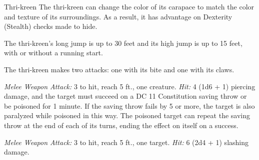 \documentclass[10pt,a4paper,twoside,bg=print,twocolumn,openany,nodeprecatedcode]{dndbook}
\begin{document}
\begin{DndMonster}[float=t]{Thri-kreen}
\DndMonsterBasics[
armor-class = {15 (natural armor)},
hit-points = {\DndDice{6d8 + 6}},
speed = {40 ft.}
]
\DndMonsterAbilityScores[
 str = 12,
 dex = 15,
 con = 13,
 int = 8,
 wis = 12,
 cha = 7
]
\DndMonsterDetails[
skills = {Perception +3, Stealth +4, Survival +3},
senses = {darkvision 60 ft., passive perception 13},
languages = {Thri-kreen},
challenge = 1,
]
The thri-kreen can change the color of its carapace to match the color and texture of its surroundings. As a result, it has advantage on Dexterity (Stealth) checks made to hide.

The thri-kreen's long jump is up to 30 feet and its high jump is up to 15 feet, with or without a running start.

The thri-kreen makes two attacks: one with its bite and one with its claws.

\textsl{Melee Weapon Attack:} 3 to hit, reach 5 ft., one creature. \textsl{Hit:} 4 (1d6 + 1) piercing damage, and the target must succeed on a DC 11 Constitution saving throw or be poisoned for 1 minute. If the saving throw fails by 5 or more, the target is also paralyzed while poisoned in this way. The poisoned target can repeat the saving throw at the end of each of its turns, ending the effect on itself on a success.

\textsl{Melee Weapon Attack:} 3 to hit, reach 5 ft., one target. \textsl{Hit:} 6 (2d4 + 1) slashing damage.

\end{DndMonster}
\end{document}
